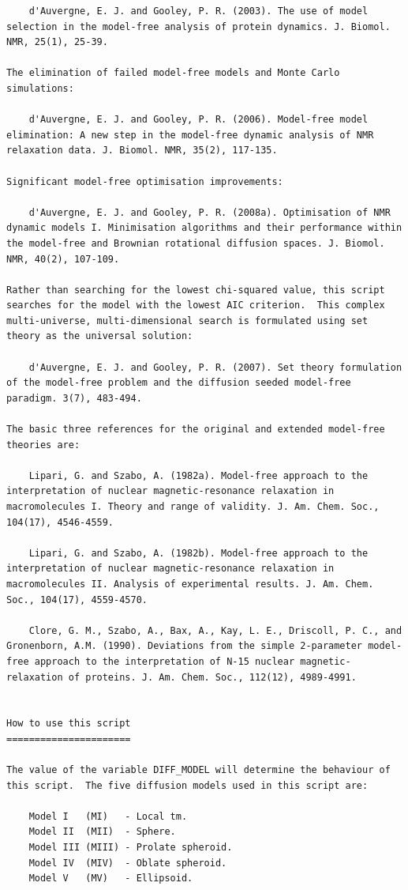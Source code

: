\begin{htmlonly}
\begin{htmlonly}
\begin{lstlisting}
    d'Auvergne, E. J. and Gooley, P. R. (2003). The use of model selection in the model-free analysis of protein dynamics. J. Biomol. NMR, 25(1), 25-39.

The elimination of failed model-free models and Monte Carlo simulations:

    d'Auvergne, E. J. and Gooley, P. R. (2006). Model-free model elimination: A new step in the model-free dynamic analysis of NMR relaxation data. J. Biomol. NMR, 35(2), 117-135.

Significant model-free optimisation improvements:

    d'Auvergne, E. J. and Gooley, P. R. (2008a). Optimisation of NMR dynamic models I. Minimisation algorithms and their performance within the model-free and Brownian rotational diffusion spaces. J. Biomol. NMR, 40(2), 107-109.

Rather than searching for the lowest chi-squared value, this script searches for the model with the lowest AIC criterion.  This complex multi-universe, multi-dimensional search is formulated using set theory as the universal solution:

    d'Auvergne, E. J. and Gooley, P. R. (2007). Set theory formulation of the model-free problem and the diffusion seeded model-free paradigm. 3(7), 483-494.

The basic three references for the original and extended model-free theories are:

    Lipari, G. and Szabo, A. (1982a). Model-free approach to the interpretation of nuclear magnetic-resonance relaxation in macromolecules I. Theory and range of validity. J. Am. Chem. Soc., 104(17), 4546-4559.

    Lipari, G. and Szabo, A. (1982b). Model-free approach to the interpretation of nuclear magnetic-resonance relaxation in macromolecules II. Analysis of experimental results. J. Am. Chem. Soc., 104(17), 4559-4570.

    Clore, G. M., Szabo, A., Bax, A., Kay, L. E., Driscoll, P. C., and Gronenborn, A.M. (1990). Deviations from the simple 2-parameter model-free approach to the interpretation of N-15 nuclear magnetic-relaxation of proteins. J. Am. Chem. Soc., 112(12), 4989-4991.


How to use this script
======================

The value of the variable DIFF_MODEL will determine the behaviour of this script.  The five diffusion models used in this script are:

    Model I   (MI)   - Local tm.
    Model II  (MII)  - Sphere.
    Model III (MIII) - Prolate spheroid.
    Model IV  (MIV)  - Oblate spheroid.
    Model V   (MV)   - Ellipsoid.


\end{lstlisting}
\end{htmlonly}
\end{htmlonly}
